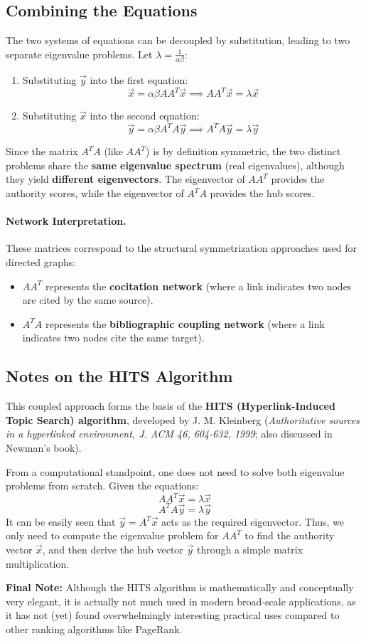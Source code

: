 \subsection{Combining the Equations}
The two systems of equations can be decoupled by substitution, leading to two separate eigenvalue problems. Let $\lambda = \frac{1}{\alpha \beta}$:
\begin{enumerate}
    \item Substituting $\vec{y}$ into the first equation:
          \[ \vec{x} = \alpha \beta A A^T \vec{x} \implies A A^T \vec{x} = \lambda \vec{x} \]
    \item Substituting $\vec{x}$ into the second equation:
          \[ \vec{y} = \alpha \beta A^T A \vec{y} \implies A^T A \vec{y} = \lambda \vec{y} \]
\end{enumerate}

Since the matrix $A^T A$ (like $A A^T$) is by definition symmetric, the two distinct problems share the \textbf{same eigenvalue spectrum} (real eigenvalues), although they yield \textbf{different eigenvectors}. The eigenvector of $A A^T$ provides the authority scores, while the eigenvector of $A^T A$ provides the hub scores.

\paragraph{Network Interpretation.}
These matrices correspond to the structural symmetrization approaches used for directed graphs:
\begin{itemize}
    \item $A A^T$ represents the \textbf{cocitation network} (where a link indicates two nodes are cited by the same source).
    \item $A^T A$ represents the \textbf{bibliographic coupling network} (where a link indicates two nodes cite the same target).
\end{itemize}

\subsection{Notes on the HITS Algorithm}
This coupled approach forms the basis of the \textbf{HITS (Hyperlink-Induced Topic Search) algorithm}, developed by J. M. Kleinberg (\textit{Authoritative sources in a hyperlinked environment, J. ACM 46, 604-632, 1999}; also discussed in Newman's book).

From a computational standpoint, one does not need to solve both eigenvalue problems from scratch. Given the equations:
\[ A A^T \vec{x} = \lambda \vec{x} \]
\[ A^T A \vec{y} = \lambda \vec{y} \]
It can be easily seen that $\vec{y} = A^T \vec{x}$ acts as the required eigenvector. Thus, we only need to compute the eigenvalue problem for $A A^T$ to find the authority vector $\vec{x}$, and then derive the hub vector $\vec{y}$ through a simple matrix multiplication.

\textbf{Final Note:} Although the HITS algorithm is mathematically and conceptually very elegant, it is actually not much used in modern broad-scale applications, as it has not (yet) found overwhelmingly interesting practical uses compared to other ranking algorithms like PageRank.